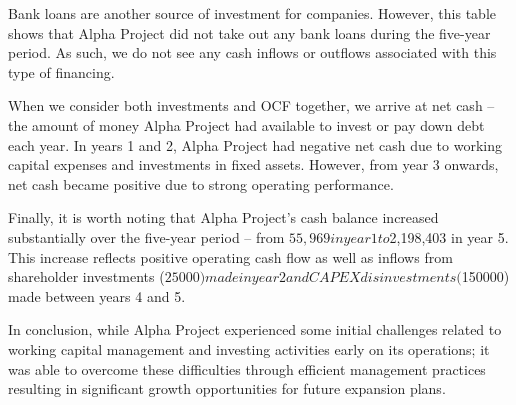Bank loans are another source of investment for companies. However, this table shows that Alpha Project did not take out any bank loans during the five-year period. As such, we do not see any cash inflows or outflows associated with this type of financing.

When we consider both investments and OCF together, we arrive at net cash – the amount of money Alpha Project had available to invest or pay down debt each year. In years 1 and 2, Alpha Project had negative net cash due to working capital expenses and investments in fixed assets. However, from year 3 onwards, net cash became positive due to strong operating performance.

Finally, it is worth noting that Alpha Project's cash balance increased substantially over the five-year period – from $55,969 in year 1 to $2,198,403 in year 5. This increase reflects positive operating cash flow as well as inflows from shareholder investments ($25000) made in year 2 and CAPEX disinvestments ($150000) made between years 4 and 5.

In conclusion, while Alpha Project experienced some initial challenges related to working capital management and investing activities early on its operations; it was able to overcome these difficulties through efficient management practices resulting in significant growth opportunities for future expansion plans.